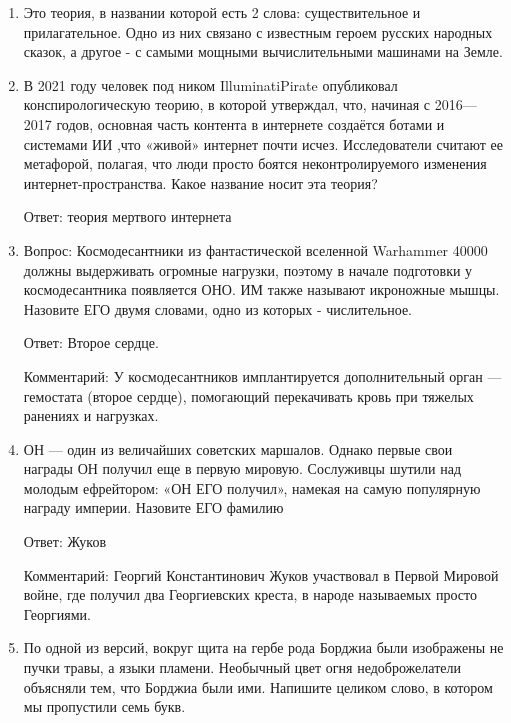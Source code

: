 \documentclass[oneside,final,14pt]{extreport}
\begin{document}
\begin{enumerate}
    Ответ: рисунок с презы

    Комментарий: Раньше применялось название "мо" (англ. mho), представляющее собой прочитанное назад слово "ом" (ohm); обозначалось перевернутой буквой $\Omega$

    \item Это теория, в названии которой есть 2 слова: существительное и прилагательное. Одно из них связано с известным героем русских народных сказок, а другое - с самыми мощными вычислительными машинами на Земле.

    \item В 2021 году человек под ником IlluminatiPirate опубликовал конспирологическую теорию, в которой утверждал, что, начиная с 2016—2017 годов, основная часть контента в интернете создаётся ботами и системами ИИ ,что «живой» интернет почти исчез. Исследователи считают ее метафорой, полагая, что люди просто боятся неконтролируемого изменения интернет-пространства. Какое название носит эта теория?

    Ответ: теория мертвого интернета

    \item Вопрос: Космодесантники из фантастической вселенной Warhammer 40000 должны выдерживать огромные нагрузки, поэтому в начале подготовки у космодесантника появляется ОНО. ИМ также называют икроножные мышцы. Назовите ЕГО двумя словами, одно из которых - числительное.

    Ответ: Второе сердце.

    Комментарий: У космодесантников имплантируется дополнительный орган — гемостата (второе сердце), помогающий перекачивать кровь при тяжелых ранениях и нагрузках.

    \item ОН — один из величайших советских маршалов. Однако первые свои награды ОН получил еще в первую мировую. Сослуживцы шутили над молодым ефрейтором: «ОН ЕГО получил», намекая на самую популярную награду империи. Назовите ЕГО фамилию

    Ответ: Жуков

    Комментарий: Георгий Константинович Жуков участвовал в Первой Мировой войне, где получил два Георгиевских креста, в народе называемых просто Георгиями.

    \item По одной из версий, вокруг щита на гербе рода Борджиа были изображены не пучки травы, а языки пламени. Необычный цвет огня недоброжелатели объясняли тем, что Борджиа были ими. Напишите целиком слово, в котором мы пропустили семь букв.


\end{enumerate}
\end{document}
